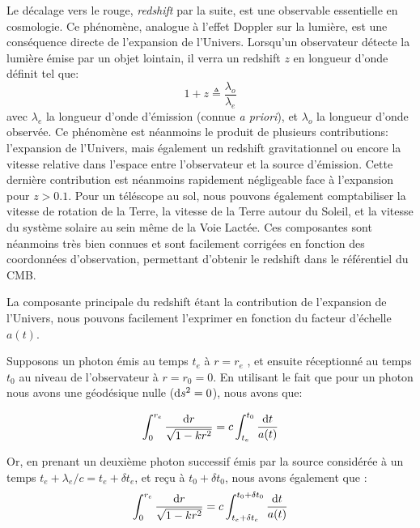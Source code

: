 \documentclass[../main/main.tex]{subfiles}
\begin{document}
Le décalage vers le rouge, \textit{redshift} par la suite, est une
observable essentielle en cosmologie. Ce phénomène, analogue à l'effet
Doppler sur la lumière, est une conséquence directe de l'expansion de
l'Univers.
Lorsqu'un observateur détecte la lumière émise par un objet lointain, il
verra un redshift $z$ en longueur d'onde définit tel que:
\begin{equation}
  \label{eq:redshift}
  1+z \triangleq \frac{\lambda_{o}}{\lambda_{e}}
\end{equation}
avec $\lambda_{e}$ la longueur d'onde d'émission (connue \textit{a priori}), et $\lambda_{o}$ la
longueur d'onde observée. Ce phénomène est néanmoins le produit de
plusieurs contributions: l'expansion de l'Univers, mais également un
redshift gravitationnel ou encore la
vitesse relative dans l'espace entre l'observateur et la source
d'émission. Cette dernière contribution est néanmoins rapidement négligeable face
à l'expansion pour $z>0.1$. Pour un téléscope au sol, nous pouvons également comptabiliser la
vitesse de rotation de la Terre, la vitesse de la Terre autour du
Soleil, et la vitesse du système solaire au sein même de la Voie
Lactée. Ces composantes sont néanmoins très bien connues et sont
facilement corrigées en fonction des coordonnées d'observation, permettant
d'obtenir le redshift dans le référentiel du CMB.

La composante principale du redshift étant la contribution de
l'expansion de l'Univers, nous pouvons facilement l'exprimer en fonction
du facteur d'échelle $a(t)$.

Supposons un photon émis au temps $t_{e}$ à $r = r_{e}$ , et ensuite réceptionné au temps $t_{0}$
au niveau de l’observateur à $r = r_{0} = 0$.
En utilisant le fait que pour un photon nous avons une géodésique nulle
($\mathrm{d} s^{2}=0$), nous avons que:

\begin{equation}
  \label{eq:geodesiquephoton1}
  \int_{0}^{r_{e}} \frac{\mathrm{d} r}{\sqrt{1-kr^{2}}}=c\int_{t_{e}}^{t_{0}}\frac{\mathrm{d} t}{a(t)}
\end{equation}

Or, en prenant un deuxième photon successif émis par la source considérée
à un temps $t_{e}+\lambda_{e}/c=t_{e}+\delta t_{e}$, et reçu à
$t_{0}+\delta t_{0}$, nous avons également que :
\begin{equation}
  \label{eq:geodesiquephoton2}
  \int_{0}^{r_{e}} \frac{\mathrm{d} r}{\sqrt{1-kr^{2}}}=c\int_{t_{e}+\delta t_{e}}^{t_{0}+\delta t_{0}}\frac{\mathrm{d} t}{a(t)}
\end{equation}
\end{document}
